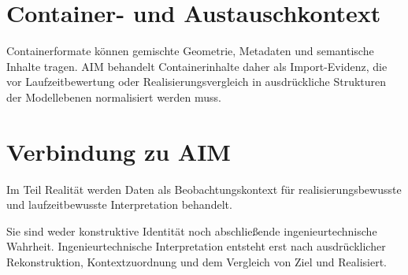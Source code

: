 \section{Container- und Austauschkontext}

Containerformate können gemischte Geometrie, Metadaten und semantische Inhalte
tragen. AIM behandelt Containerinhalte daher als Import-Evidenz, die vor
Laufzeitbewertung oder Realisierungsvergleich in ausdrückliche Strukturen der
Modellebenen normalisiert werden muss.

\section{Verbindung zu AIM}

\begin{summary}
Im Teil Realität werden Daten als Beobachtungskontext für
realisierungsbewusste und laufzeitbewusste Interpretation behandelt.

Sie sind weder konstruktive Identität noch abschließende ingenieurtechnische
Wahrheit. Ingenieurtechnische Interpretation entsteht erst nach
ausdrücklicher Rekonstruktion, Kontextzuordnung und dem Vergleich von Ziel und
Realisiert.
\end{summary}
